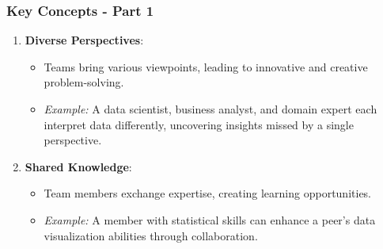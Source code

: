 \documentclass[aspectratio=169]{beamer}
\begin{document}
\begin{frame}[fragile]
    \frametitle{Key Concepts - Part 1}
    \begin{enumerate}
        \item \textbf{Diverse Perspectives}:
            \begin{itemize}
                \item Teams bring various viewpoints, leading to innovative and creative problem-solving.
                \item \textit{Example:} A data scientist, business analyst, and domain expert each interpret data differently, uncovering insights missed by a single perspective.
            \end{itemize}

        \item \textbf{Shared Knowledge}:
            \begin{itemize}
                \item Team members exchange expertise, creating learning opportunities.
                \item \textit{Example:} A member with statistical skills can enhance a peer's data visualization abilities through collaboration.
            \end{itemize}
    \end{enumerate}
\end{frame}
\end{document}
